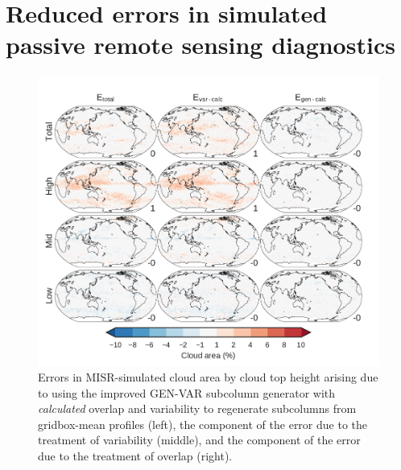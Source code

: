 \section{Reduced errors in simulated passive remote sensing
diagnostics}\label{sec:subgrid2Passive}

\begin{figure}[htbp]
\centering
\includegraphics{graphics/subgrid2_cldmisr_maps_gen-var-calc_diff.pdf}
\caption{\label{fig:cldmisrMapsCalcDiff}Errors in MISR-simulated cloud
area by cloud top height arising due to using the improved GEN-VAR
subcolumn generator with \emph{calculated} overlap and variability to
regenerate subcolumns from gridbox-mean profiles (left), the component
of the error due to the treatment of variability (middle), and the
component of the error due to the treatment of overlap
(right).}\label{fig:cldmisrMapsCalcDiff}
\end{figure}

